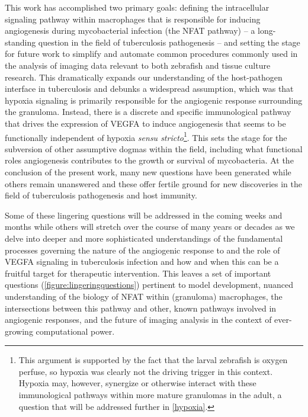 This work has accomplished two primary goals: defining the intracellular signaling pathway within macrophages that is responsible for inducing angiogenesis during mycobacterial infection (the NFAT pathway) -- a long\hyp{}standing question in the field of tuberculosis pathogenesis -- and setting the stage for future work to simplify and automate common procedures commonly used in the analysis of imaging data relevant to both zebrafish and tissue culture research. This dramatically expands our understanding of the host\hyp{}pathogen interface in tuberculosis and debunks a widespread assumption, which was that hypoxia signaling is primarily responsible for the angiogenic response surrounding the granuloma. Instead, there is a discrete and specific immunological pathway that drives the expression of VEGFA to induce angiogenesis that seems to be functionally independent of hypoxia \textit{sensu stricto}\footnote{This argument is supported by the fact that the larval zebrafish is oxygen perfuse, so hypoxia was clearly not the driving trigger in this context. Hypoxia may, however, synergize or otherwise interact with these immunological pathways within more mature granulomas in the adult, a question that will be addressed further in \autoref{hypoxia}.}. This sets the stage for the subversion of other assumptive dogmas within the field, including what functional roles angiogenesis contributes to the growth or survival of mycobacteria. At the conclusion of the present work, many new questions have been generated while others remain unanswered and these offer fertile ground for new discoveries in the field of tuberculosis pathogenesis and host immunity. 

Some of these lingering questions will be addressed in the coming weeks and months while others will stretch over the course of many years or decades as we delve into deeper and more sophisticated understandings of the fundamental processes governing the nature of the angiogenic response to and the role of VEGFA signaling in tuberculosis infection and how and when this can be a fruitful target for therapeutic intervention. This leaves a set of important questions (\autoref{figure:lingeringquestions}) pertinent to model development, nuanced understanding of the biology of NFAT within (granuloma) macrophages, the intersections between this pathway and other, known pathways involved in angiogenic responses, and the future of imaging analysis in the context of ever\hyp{}growing computational power. 

